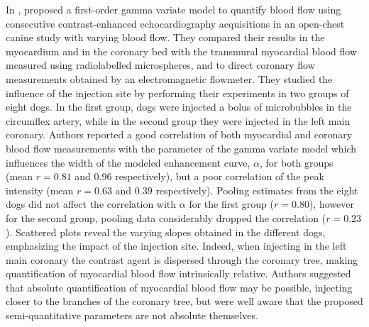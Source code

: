 In \citeyear{Kaul:1989il}, \citet{Kaul:1989il} proposed a first-order gamma variate model to quantify blood flow using consecutive contrast-enhanced echocardiography acquisitions in an open-chest canine study with varying blood flow. 
They compared their results in the myocardium and in the coronary bed with the transmural myocardial blood flow measured using radiolabelled microspheres, and to direct coronary flow measurements obtained by an electromagnetic flowmeter. 
They studied the influence of the injection site by performing their experiments in two groups of eight dogs. 
In the first group, dogs were injected a bolus of microbubbles in the circumflex artery, while in the second group they were injected in the left main coronary.
Authors reported a good correlation of both myocardial and coronary blood flow measurements with the parameter of the gamma variate model which influences the width of the modeled enhancement curve, $\alpha$, for both groups (mean $r = 0.81$ and $0.96$ respectively), but a poor correlation of the peak intensity (mean $r = 0.63$ and $0.39$ respectively). 
Pooling estimates from the eight dogs did not affect the correlation with $\alpha$ for the first group ($r = 0.80$), however for the second group, pooling data considerably dropped the correlation ($r = 0.23$).
Scattered plots reveal the varying slopes obtained in the different dogs, emphasizing the impact of the injection site.
Indeed, when injecting in the left main coronary the contrast agent is dispersed through the coronary tree, making quantification of myocardial blood flow intrinsically relative.
Authors suggested that absolute quantification of myocardial blood flow may be possible, injecting closer to the branches of the coronary tree, but were well aware that the proposed semi-quantitative parameters are not absolute themselves.

